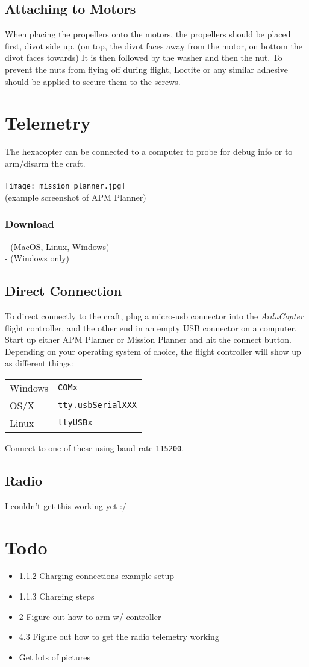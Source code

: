 \documentclass{style}
\begin{document}
\subsection{Attaching to Motors}
When placing the propellers onto the motors, the propellers should be placed first, divot side up. (on top, the divot faces away from the motor, on bottom the divot faces towards)
It is then followed by the washer and then the nut.
To prevent the nuts from flying off during flight, Loctite or any similar adhesive should be applied to secure them to the screws.
\section{Telemetry}
The hexacopter can be connected to a computer to probe for debug info or to arm/disarm the craft. \\ \\
\texttt{[image: mission\_planner.jpg]} \\
(example screenshot of APM Planner)
\subsubsection{Download}
 - (MacOS, Linux, Windows) \\
 - (Windows only)
\subsection{Direct Connection}
To direct connectly to the craft, plug a micro-usb connector into the \textit{ArduCopter} flight controller, and the other end in an empty USB connector on a computer.
Start up either APM Planner or Mission Planner and hit the connect button.
Depending on your operating system of choice, the flight controller will show up as different things:
\newline
\newline
\begin{tabular}{ l l }
  Windows & \texttt{COMx} \\
  OS/X & \texttt{tty.usbSerialXXX} \\
  Linux & \texttt{ttyUSBx}
\end{tabular}
\newline
\newline
Connect to one of these using baud rate \texttt{115200}.
\subsection{Radio}
I couldn't get this working yet :/
\pagebreak
\section{Todo}
\begin{itemize}
\item 1.1.2 Charging connections example setup
\item 1.1.3 Charging steps
\item 2 Figure out how to arm w/ controller
\item 4.3 Figure out how to get the radio telemetry working
\item Get lots of pictures
\end{itemize}
\end{document}
